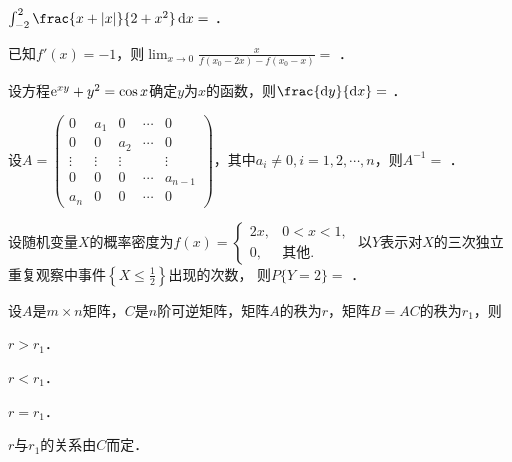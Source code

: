 \documentclass[plain,noanswer,medmath]{../../template/jnuexam}
\begin{document}






\begin{problem}
$\int_{-2}^2\frac{x + |x|}{2 + x^2} \dx =$ \fillin{}．
\end{problem}


\begin{problem}
已知$f'(x) = - 1$，则$\lim_{x \to 0} \frac{x}{f(x_0 - 2x) - f(x_0 - x)} =$ \fillin{}．
\end{problem}


\begin{problem}
设方程$\mathrm{e}^{xy} + y^2 = \cos x$确定$y$为$x$的函数，则$\frac{\dy}{\dx} =$ \fillin{}．
\end{problem}


\begin{problem}
设$A = \begin{pmatrix}
       0 &    a_1 &      0 & \cdots & 0 \\
       0 &      0 &    a_2 & \cdots & 0 \\
  \vdots & \vdots & \vdots &        & \vdots \\
       0 &      0 &      0 & \cdots & a_{n - 1} \\
     a_n &      0 &      0 & \cdots & 0
\end{pmatrix}$，其中$a_i \ne 0,i = 1,2, \cdots ,n$，则$A^{-1} =$ \fillin{}．
\end{problem}


\begin{problem}
设随机变量$X$的概率密度为$f(x) = \begin{cases}
  2x, & 0 < x < 1, \\
   0, & \text{其他}.
\end{cases}$
以$Y$表示对$X$的三次独立重复观察中事件$\left\{X \le \frac{1}{2} \right\}$出现的次数，
则$P\{Y = 2\} =$ \fillin{}．
\end{problem}








\begin{problem}
设$A$是$m \times n$矩阵，$C$是$n$阶可逆矩阵，矩阵$A$的秩为$r$，矩阵$B = AC$的秩为$r_1$，则\pickout{}
\begin{abcd}
\item $r > r_1$．                            
\item $r < r_1$．
\item $r = r_1$．                            
\item $r$与$r_1$的关系由$C$而定．
\end{abcd}
\end{problem}
\end{document}
